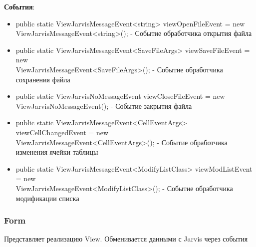 \documentclass[a4paper,12pt, fleqn]{article}
\theoremstyle{plain} %
\theoremstyle{definition} %
\theoremstyle{remark} %
\numberwithin{equation}{section}
\begin{document}
\textbf{События}:
\begin{itemize}
	\item public static ViewJarvisMessageEvent<string> viewOpenFileEvent = new\\ ViewJarvisMessageEvent<string>(); - Событие обработчика открытия файла
	\item public static ViewJarvisMessageEvent<SaveFileArgs> viewSaveFileEvent = new\\ ViewJarvisMessageEvent<SaveFileArgs>(); - Событие обработчика сохранения файла
	\item public static ViewJarvisNoMessageEvent viewCloseFileEvent = new\\ ViewJarvisNoMessageEvent(); - Событие закрытия файла
	\item public static ViewJarvisMessageEvent<CellEventArgs> viewCellChangedEvent = new\\ ViewJarvisMessageEvent<CellEventArgs>(); - Событие обработчика изменения ячейки таблицы
	\item public static ViewJarvisMessageEvent<ModifyListClass> viewModListEvent = new\\ ViewJarvisMessageEvent<ModifyListClass>(); - Событие обработчика модификации списка
\end{itemize}
\subsubsection{Form}
Представляет реализацию View. Обменивается данными с Jarvis через события
\end{document}
